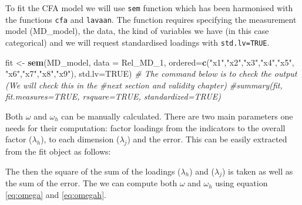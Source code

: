 \documentclass[]{book}
\newenvironment{Shaded}{\begin{snugshade}}{\end{snugshade}}
\newcommand{\CommentTok}[1]{\textcolor[rgb]{0.56,0.35,0.01}{\textit{#1}}}
\newcommand{\DataTypeTok}[1]{\textcolor[rgb]{0.13,0.29,0.53}{#1}}
\newcommand{\DecValTok}[1]{\textcolor[rgb]{0.00,0.00,0.81}{#1}}
\newcommand{\KeywordTok}[1]{\textcolor[rgb]{0.13,0.29,0.53}{\textbf{#1}}}
\newcommand{\NormalTok}[1]{#1}
\newcommand{\OperatorTok}[1]{\textcolor[rgb]{0.81,0.36,0.00}{\textbf{#1}}}
\newcommand{\OtherTok}[1]{\textcolor[rgb]{0.56,0.35,0.01}{#1}}
\newcommand{\StringTok}[1]{\textcolor[rgb]{0.31,0.60,0.02}{#1}}
\begin{document}
To fit the CFA model we will use \texttt{sem} function which has been harmonised with the functions \texttt{cfa} and \texttt{lavaan}. The function requires specifying the measurement model (MD\_model), the data, the kind of variables we have (in this case categorical) and we will request standardised loadings with \texttt{std.lv=TRUE}.

\begin{Shaded}
\begin{Highlighting}[]
\NormalTok{fit <-}\StringTok{ }\KeywordTok{sem}\NormalTok{(MD_model, }\DataTypeTok{data =}\NormalTok{ Rel_MD_}\DecValTok{1}\NormalTok{, }
           \DataTypeTok{ordered=}\KeywordTok{c}\NormalTok{(}\StringTok{"x1"}\NormalTok{,}\StringTok{"x2"}\NormalTok{,}\StringTok{"x3"}\NormalTok{,}\StringTok{"x4"}\NormalTok{,}\StringTok{"x5"}\NormalTok{,}
                     \StringTok{"x6"}\NormalTok{,}\StringTok{"x7"}\NormalTok{,}\StringTok{"x8"}\NormalTok{,}\StringTok{"x9"}\NormalTok{),}
           \DataTypeTok{std.lv=}\OtherTok{TRUE}\NormalTok{)}
\CommentTok{# The command below is to check the output (We will check this in the }
\CommentTok{#next section and validity chapter)}
\CommentTok{#summary(fit, fit.measures=TRUE, rsquare=TRUE, standardized=TRUE)}
\end{Highlighting}
\end{Shaded}

Both \(\omega\) and \(\omega_h\) can be manually calculated. There are two main parameters one needs for their computation: factor loadings from the indicators to the overall factor (\(\lambda_h\)), to each dimension (\(\lambda_j\)) and the error. This can be easily extracted from the fit object as follows:

\begin{Shaded}
\end{Shaded}

The then the square of the sum of the loadings (\(\lambda_h\)) and (\(\lambda_j\)) is taken as well as the sum of the error. The we can compute both \(\omega\) and \(\omega_h\) using equation \eqref{eq:omega} and \eqref{eq:omegah}.
\end{document}
